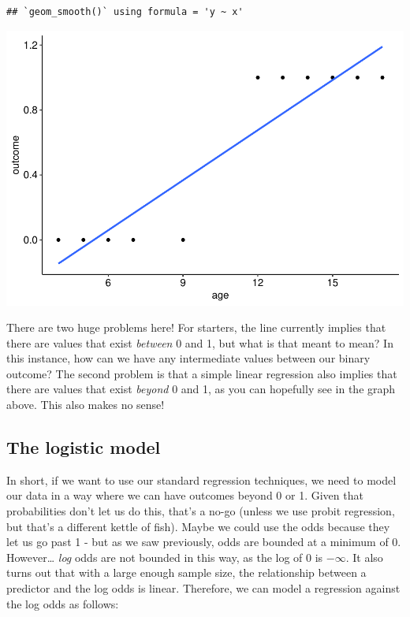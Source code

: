 \documentclass[
]{book}
\begin{document}
\begin{verbatim}
## `geom_smooth()` using formula = 'y ~ x'
\end{verbatim}

\includegraphics{_main_files/figure-latex/unnamed-chunk-287-1.pdf}

There are two huge problems here! For starters, the line currently implies that there are values that exist \emph{between} 0 and 1, but what is that meant to mean? In this instance, how can we have any intermediate values between our binary outcome? The second problem is that a simple linear regression also implies that there are values that exist \emph{beyond} 0 and 1, as you can hopefully see in the graph above. This also makes no sense!

\hypertarget{the-logistic-model}{%
\subsection{The logistic model}\label{the-logistic-model}}

In short, if we want to use our standard regression techniques, we need to model our data in a way where we can have outcomes beyond 0 or 1. Given that probabilities don't let us do this, that's a no-go (unless we use probit regression, but that's a different kettle of fish). Maybe we could use the odds because they let us go past 1 - but as we saw previously, odds are bounded at a minimum of 0. However\ldots{} \emph{log} odds are not bounded in this way, as the log of 0 is \(- \infty\). It also turns out that with a large enough sample size, the relationship between a predictor and the log odds is linear. Therefore, we can model a regression against the log odds as follows:
\end{document}
